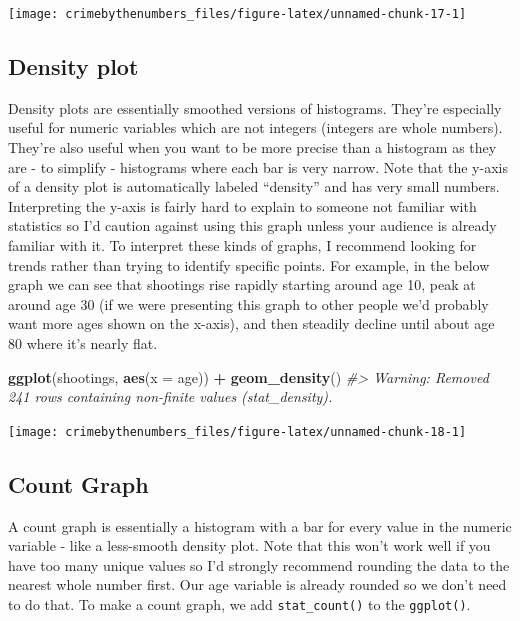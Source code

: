 \documentclass[
  12pt,
]{book}
\newenvironment{Shaded}{\begin{snugshade}}{\end{snugshade}}
\newcommand{\CommentTok}[1]{\textcolor[rgb]{0.37,0.37,0.37}{\textit{#1}}}
\newcommand{\DataTypeTok}[1]{\textcolor[rgb]{0.27,0.27,0.27}{#1}}
\newcommand{\KeywordTok}[1]{\textcolor[rgb]{0.27,0.27,0.27}{\textbf{#1}}}
\newcommand{\NormalTok}[1]{#1}
\newcommand{\OperatorTok}[1]{\textcolor[rgb]{0.43,0.43,0.43}{\textbf{#1}}}
\newcommand{\StringTok}[1]{\textcolor[rgb]{0.5,0.5,0.5}{#1}}
\begin{document}
\begin{center}\texttt{[image: crimebythenumbers\_files/figure-latex/unnamed-chunk-17-1]} \end{center}

\hypertarget{density-plot}{%
\subsection{Density plot}\label{density-plot}}

Density plots are essentially smoothed versions of histograms. They're especially useful for numeric variables which are not integers (integers are whole numbers). They're also useful when you want to be more precise than a histogram as they are - to simplify - histograms where each bar is very narrow. Note that the y-axis of a density plot is automatically labeled ``density'' and has very small numbers. Interpreting the y-axis is fairly hard to explain to someone not familiar with statistics so I'd caution against using this graph unless your audience is already familiar with it. To interpret these kinds of graphs, I recommend looking for trends rather than trying to identify specific points. For example, in the below graph we can see that shootings rise rapidly starting around age 10, peak at around age 30 (if we were presenting this graph to other people we'd probably want more ages shown on the x-axis), and then steadily decline until about age 80 where it's nearly flat.

\begin{Shaded}
\begin{Highlighting}[]
\KeywordTok{ggplot}\NormalTok{(shootings, }\KeywordTok{aes}\NormalTok{(}\DataTypeTok{x =}\NormalTok{ age)) }\OperatorTok{+}\StringTok{ }
\StringTok{  }\KeywordTok{geom\_density}\NormalTok{()}
\CommentTok{\#> Warning: Removed 241 rows containing non{-}finite values (stat\_density).}
\end{Highlighting}
\end{Shaded}

\begin{center}\texttt{[image: crimebythenumbers\_files/figure-latex/unnamed-chunk-18-1]} \end{center}

\hypertarget{count-graph}{%
\subsection{Count Graph}\label{count-graph}}

A count graph is essentially a histogram with a bar for every value in the numeric variable - like a less-smooth density plot. Note that this won't work well if you have too many unique values so I'd strongly recommend rounding the data to the nearest whole number first. Our age variable is already rounded so we don't need to do that. To make a count graph, we add \texttt{stat\_count()} to the \texttt{ggplot()}.
\end{document}
